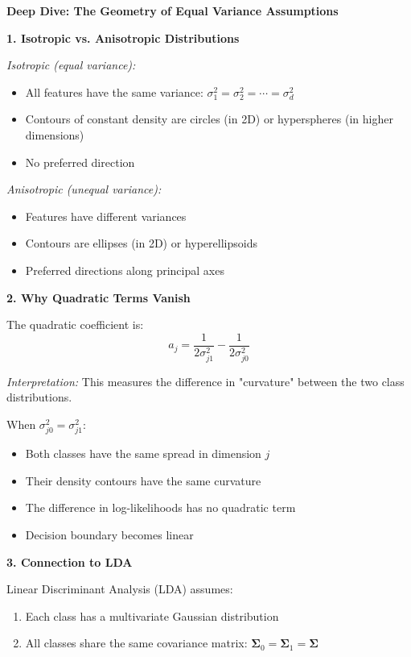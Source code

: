 \documentclass[12pt]{article}
\begin{document}
\begin{explanation}
\textbf{Deep Dive: The Geometry of Equal Variance Assumptions}

\textbf{1. Isotropic vs. Anisotropic Distributions}

\textit{Isotropic (equal variance):}
\begin{itemize}
    \item All features have the same variance: $\sigma_1^2 = \sigma_2^2 = \cdots = \sigma_d^2$
    \item Contours of constant density are circles (in 2D) or hyperspheres (in higher dimensions)
    \item No preferred direction
\end{itemize}

\textit{Anisotropic (unequal variance):}
\begin{itemize}
    \item Features have different variances
    \item Contours are ellipses (in 2D) or hyperellipsoids
    \item Preferred directions along principal axes
\end{itemize}

\textbf{2. Why Quadratic Terms Vanish}

The quadratic coefficient is:
\[
a_j = \frac{1}{2\sigma_{j1}^2} - \frac{1}{2\sigma_{j0}^2}
\]

\textit{Interpretation:} This measures the difference in "curvature" between the two class distributions.

When $\sigma_{j0}^2 = \sigma_{j1}^2$:
\begin{itemize}
    \item Both classes have the same spread in dimension $j$
    \item Their density contours have the same curvature
    \item The difference in log-likelihoods has no quadratic term
    \item Decision boundary becomes linear
\end{itemize}

\textbf{3. Connection to LDA}

Linear Discriminant Analysis (LDA) assumes:
\begin{enumerate}
    \item Each class has a multivariate Gaussian distribution
    \item All classes share the same covariance matrix: $\boldsymbol{\Sigma}_0 = \boldsymbol{\Sigma}_1 = \boldsymbol{\Sigma}$
\end{enumerate}


\end{explanation}
\end{document}
